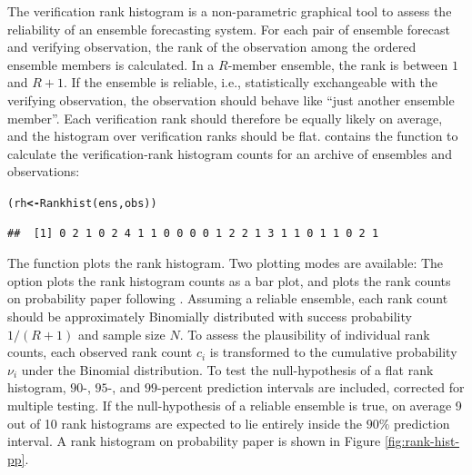 \documentclass[article]{jss}\usepackage[]{graphicx}\usepackage[]{color}
\makeatletter
\newcommand{\hlstd}[1]{\textcolor[rgb]{0,0,0}{#1}}%
\newcommand{\hlkwb}[1]{\textcolor[rgb]{0.502,0.502,0.753}{\textbf{#1}}}%
\newcommand{\hlkwd}[1]{\textcolor[rgb]{0,0.267,0.4}{#1}}%
\newenvironment{kframe}{%
 \def\at@end@of@kframe{}%
 \ifinner\ifhmode%
  \def\at@end@of@kframe{\end{minipage}}%
  \begin{minipage}{\columnwidth}%
 \fi\fi%
 \def\FrameCommand##1{\hskip\@totalleftmargin \hskip-\fboxsep
 \colorbox{shadecolor}{##1}\hskip-\fboxsep
     \hskip-\linewidth \hskip-\@totalleftmargin \hskip\columnwidth}%
 \MakeFramed {\advance\hsize-\width
   \@totalleftmargin\z@ \linewidth\hsize
   \@setminipage}}%
 {\par\unskip\endMakeFramed%
 \at@end@of@kframe}
\newenvironment{knitrout}{}{} %
\makeatother
\begin{document}
The verification rank histogram \citep{talagrand1997evaluation,hamill2001interpretation} is a non-parametric graphical tool to assess the reliability of an ensemble forecasting system.
For each pair of ensemble forecast and verifying observation, the rank of the observation among the ordered ensemble members is calculated.
In a $R$-member ensemble, the rank is between $1$ and $R+1$.
If the ensemble is reliable, i.e., statistically exchangeable with the verifying observation, the observation should behave like ``just another ensemble member''. 
Each verification rank should therefore be equally likely on average, and the histogram over verification ranks should be flat. 
 contains the function  to calculate the verification-rank histogram counts for an archive of ensembles and observations:
%
\begin{knitrout}
\color{fgcolor}\begin{kframe}
\begin{alltt}
\hlstd{(rh} \hlkwb{<-} \hlkwd{Rankhist}\hlstd{(ens, obs))}
\end{alltt}
\begin{verbatim}
##  [1] 0 2 1 0 2 4 1 1 0 0 0 0 1 2 2 1 3 1 1 0 1 1 0 2 1
\end{verbatim}
\end{kframe}
\end{knitrout}


The function  plots the rank histogram.
Two plotting modes are available:
The option  plots the rank histogram counts as a bar plot, and  plots the rank counts on probability paper following \citet{broecker2008reliability}. 
Assuming a reliable ensemble, each rank count should be approximately Binomially distributed with success probability $1/(R+1)$ and sample size $N$.
To assess the plausibility of individual rank counts, each observed rank count $c_i$ is transformed to the cumulative probability $\nu_i$ under the Binomial distribution.
To test the null-hypothesis of a flat rank histogram, $90$-, $95$-, and $99$-percent prediction intervals are included, corrected for multiple testing.
If the null-hypothesis of a reliable ensemble is true, on average 9 out of 10 rank histograms are expected to lie entirely inside the $90\%$ prediction interval.
A rank histogram on probability paper is shown in Figure \ref{fig:rank-hist-pp}. 
\end{document}
